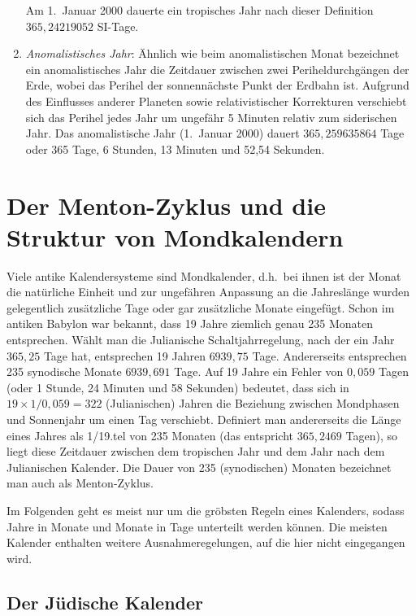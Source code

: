 \begin{enumerate}
Am 1.\ Januar 2000 dauerte ein tropisches Jahr nach dieser Definition $365,24219052$ SI-Tage. 
\item
\textit{Anomalistisches Jahr}:
\"Ahnlich wie beim anomalistischen Monat bezeichnet ein anomalistisches Jahr die Zeitdauer
zwischen zwei Periheldurchg\"angen der Erde, wobei das Perihel der sonnenn\"achste Punkt der
Erdbahn ist. Aufgrund des Einflusses anderer Planeten sowie relativistischer Korrekturen
verschiebt sich das Perihel jedes Jahr um ungef\"ahr 5 Minuten relativ zum siderischen Jahr.
Das anomalistische Jahr (1.\ Januar 2000) dauert $365,259635864$ Tage oder 365 Tage,
6 Stunden, 13 Minuten und 52,54 Sekunden.
\end{enumerate}

\section{Der Menton-Zyklus und die Struktur von Mondkalendern}

Viele antike Kalendersysteme sind 
Mondkalender, d.h.\ bei ihnen ist der Monat die nat\"urliche
Einheit und zur ungef\"ahren Anpassung an die Jahresl\"ange wurden gelegentlich zus\"atzliche Tage oder gar
zus\"atzliche Monate eingef\"ugt. Schon im antiken Babylon war bekannt, dass 19 Jahre ziemlich genau
235 Monaten entsprechen. W\"ahlt man die Julianische Schaltjahrregelung, nach der ein Jahr
$365,25$ Tage hat, entsprechen 19 Jahren $6939,75$ Tage. Andererseits entsprechen 235 synodische
Monate $6939,691$ Tage. Auf 19 Jahre ein Fehler von $0,059$ Tagen (oder 1 Stunde, 24 Minuten und
58 Sekunden) bedeutet, dass sich in $19 \times 1/0,059 = 322$ 
(Julianischen) Jahren die Beziehung zwischen Mondphasen und Sonnenjahr um einen Tag verschiebt. 
Definiert man andererseits die L\"ange eines Jahres als 1/19.tel von 235 Monaten (das entspricht $365,2469$ Tagen), 
so liegt diese Zeitdauer zwischen dem tropischen Jahr und dem Jahr nach dem 
Julianischen Kalender. 
Die Dauer von 235 (synodischen) Monaten 
bezeichnet man auch als Menton-Zyklus. 

Im Folgenden geht es meist nur um die gr\"obsten Regeln eines Kalenders, sodass Jahre in Monate und Monate in 
Tage unterteilt werden k\"onnen. Die meisten Kalender enthalten weitere Ausnahmeregelungen, auf die hier
nicht eingegangen wird. 

\subsection{Der J\"udische Kalender}

